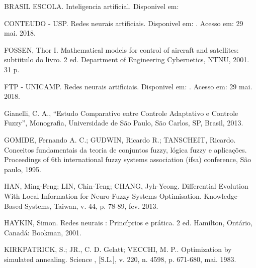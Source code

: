 \documentclass[10pt,a4paper]{article}
\numberwithin{equation}{section}
\begin{document}
\par BRASIL ESCOLA. Inteligencia artificial. Disponivel em:  \hfill \break {} \\

\par CONTEUDO - USP. Redes neurais artificiais. Disponivel em: \hfill \break {}. Acesso em: 29 mai. 2018.\\

\par FOSSEN, Thor I. Mathematical models for control of aircraft and satellites: subtiitulo do livro. 2 ed.  Department of Engineering Cybernetics, NTNU, 2001. 31 p.\\

\par FTP - UNICAMP. Redes neurais artificiais. Disponivel em:  \hfill \break {}. Acesso em: 29 mai. 2018.

\par Gianelli, C. A., “Estudo Comparativo entre Controle Adaptativo e Controle Fuzzy”, Monografia, Universidade de São Paulo, São Carlos, SP, Brasil, 2013.\\

\par GOMIDE, Fernando A. C.; GUDWIN, Ricardo R.; TANSCHEIT, Ricardo. Conceitos fundamentais da teoria de conjuntos fuzzy, lógica fuzzy e aplicações. Proceedings of 6th international fuzzy systems association (ifsa) conference, São paulo,  1995.\\

\par HAN, Ming-Feng; LIN, Chin-Teng; CHANG, Jyh-Yeong. Differential Evolution With Local Information for Neuro-Fuzzy Systems Optimisation. Knowledge-Based Systems, Taiwan, v. 44, p. 78-89, fev. 2013.\\

\par HAYKIN, Simon. Redes neurais : Princíprios e prática. 2 ed. Hamilton, Ontário, Canadá: Bookman, 2001.\\

\par KIRKPATRICK, S.; JR., C. D. Gelatt; VECCHI, M. P.. Optimization by simulated annealing. Science , [S.L.], v. 220, n. 4598, p. 671-680, mai. 1983.\\
\end{document}
